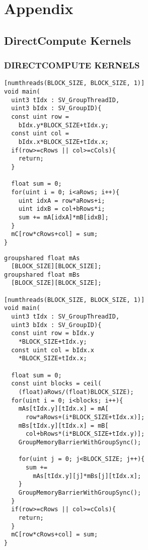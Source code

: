 \section{Appendix}

\subsection{DirectCompute Kernels}
\begin{frame}[fragile]
\frametitle{DIRECTCOMPUTE KERNELS}

\begin{multicols}{2}
\begin{lstlisting}
[numthreads(BLOCK_SIZE, BLOCK_SIZE, 1)]
void main(
  uint3 tIdx : SV_GroupThreadID,
  uint3 bIdx : SV_GroupID){
  const uint row =
    bIdx.y*BLOCK_SIZE+tIdx.y;
  const uint col =
    bIdx.x*BLOCK_SIZE+tIdx.x;
  if(row>=cRows || col>=cCols){
    return;
  }

  float sum = 0;
  for(uint i = 0; i<aRows; i++){
    uint idxA = row*aRows+i;
    uint idxB = col+bRows*i;
    sum += mA[idxA]*mB[idxB];
  }
  mC[row*cRows+col] = sum;
}
\end{lstlisting}
\begin{lstlisting}
groupshared float mAs
  [BLOCK_SIZE][BLOCK_SIZE];
groupshared float mBs
  [BLOCK_SIZE][BLOCK_SIZE];

[numthreads(BLOCK_SIZE, BLOCK_SIZE, 1)]
void main(
  uint3 tIdx : SV_GroupThreadID,
  uint3 bIdx : SV_GroupID){
  const uint row = bIdx.y
    *BLOCK_SIZE+tIdx.y;
  const uint col = bIdx.x
    *BLOCK_SIZE+tIdx.x;
  
  float sum = 0;
  const uint blocks = ceil( 
    (float)aRows/(float)BLOCK_SIZE);
  for(uint i = 0; i<blocks; i++){
    mAs[tIdx.y][tIdx.x] = mA[ 
      row*aRows+(i*BLOCK_SIZE+tIdx.x)];
    mBs[tIdx.y][tIdx.x] = mB[ 
      col+bRows*(i*BLOCK_SIZE+tIdx.y)];
    GroupMemoryBarrierWithGroupSync();

    for(uint j = 0; j<BLOCK_SIZE; j++){
      sum += 
        mAs[tIdx.y][j]*mBs[j][tIdx.x];
    }
    GroupMemoryBarrierWithGroupSync();
  }
  if(row>=cRows || col>=cCols){
    return;
  }
  mC[row*cRows+col] = sum;
}
\end{lstlisting}
\end{multicols}

\end{frame}
